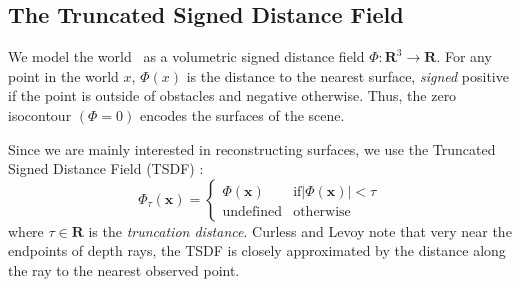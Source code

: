 \documentclass[conference]{IEEEtran}
\newcommand{\TSDF}{TSDF\xspace}
\begin{document}
\subsection{The Truncated Signed Distance Field}
\label{section:TSDF}
We model the world~\cite{Curless1996} as a volumetric signed distance field $\Phi: \mathbf{R}^3
\to \mathbf{R}$. For any point in the world $x$, $\Phi(x)$
is the distance to the nearest surface, \emph{signed} positive if the point is
outside of obstacles and negative otherwise. Thus, the zero isocontour $(\Phi =
0)$ encodes the surfaces of the scene.

Since we are mainly interested in reconstructing surfaces,
we use the Truncated Signed Distance Field (\TSDF) \cite{Curless1996}:
\begin{equation}
	\Phi_{\tau}(\mathbf{x}) =
	\begin{cases}
		\Phi(\mathbf{x}) &  \text{if} |\Phi(\mathbf{x})| < \tau \\
		\text{undefined} & \text{otherwise}
	\end{cases}
\end{equation}
where $\tau \in \mathbf{R}$ is the \emph{truncation distance}.  Curless and
Levoy \cite{Curless1996} note that very near the endpoints of depth rays, the
\TSDF is closely approximated by the distance along the ray to the nearest observed
point.   
 
\end{document}
